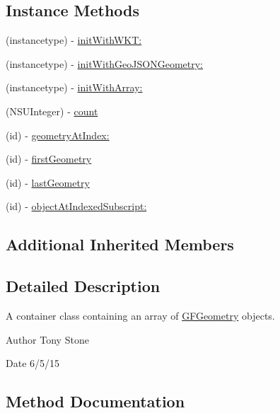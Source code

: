 \subsection*{Instance Methods}
\begin{DoxyCompactItemize}
\item 
(instancetype) -\/ \hyperlink{interface_g_f_geometry_collection_a13156620e5298fe7d286bb800df4097b}{init\+With\+W\+K\+T\+:}
\item 
(instancetype) -\/ \hyperlink{interface_g_f_geometry_collection_adc8a317a694f82808d1e02e53e300f8f}{init\+With\+Geo\+J\+S\+O\+N\+Geometry\+:}
\item 
(instancetype) -\/ \hyperlink{interface_g_f_geometry_collection_a260bb3daa9d3324cb1cc2fa9ef3a61e9}{init\+With\+Array\+:}
\item 
(N\+S\+U\+Integer) -\/ \hyperlink{interface_g_f_geometry_collection_a020dd5245b572a391ccbd1ea92699240}{count}
\item 
(id) -\/ \hyperlink{interface_g_f_geometry_collection_a4cd182279facec2850b47634aa0f6297}{geometry\+At\+Index\+:}
\item 
(id) -\/ \hyperlink{interface_g_f_geometry_collection_a610f72a22d76a3ce6c9eaeb2dad35c0e}{first\+Geometry}
\item 
(id) -\/ \hyperlink{interface_g_f_geometry_collection_a89b3b6e2097cf5899a6d635ddcb95ef3}{last\+Geometry}
\item 
(id) -\/ \hyperlink{interface_g_f_geometry_collection_ac67dd4526580a8a38408e39c489a7503}{object\+At\+Indexed\+Subscript\+:}
\end{DoxyCompactItemize}
\subsection*{Additional Inherited Members}


\subsection{Detailed Description}
A container class containing an array of \hyperlink{interface_g_f_geometry}{G\+F\+Geometry} objects. 

\begin{DoxyAuthor}{Author}
Tony Stone 
\end{DoxyAuthor}
\begin{DoxyDate}{Date}
6/5/15 
\end{DoxyDate}


\subsection{Method Documentation}
\hypertarget{interface_g_f_geometry_collection_a13156620e5298fe7d286bb800df4097b}{}
